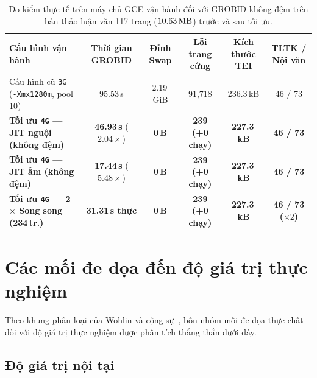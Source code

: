 {\setlength{\tabcolsep}{3.5pt}
\begin{table}[!htbp]
\centering
\caption{Đo kiểm thực tế trên máy chủ GCE vận hành đối với GROBID không đệm trên bản thảo luận văn 117 trang ($10.63\text{\,MB}$) trước và sau tối ưu.}\label{tab:nfr-grobid-prod}
\begin{tabular}{|L{0.28}|C{0.15}|C{0.13}|C{0.16}|C{0.13}|C{0.15}|}
\hline
\textbf{Cấu hình vận hành} & \textbf{Thời gian GROBID} & \textbf{Đỉnh Swap} & \textbf{Lỗi trang cứng} & \textbf{Kích thước TEI} & \textbf{TLTK / Nội văn} \\
\hline
Cấu hình cũ \texttt{3G} (\texttt{-Xmx1280m}, pool 10) & 95.53\,s & 2.19\,GiB & 91,718 & 236.3\,kB & 46 / 73 \\
\hline
\textbf{Tối ưu \texttt{4G} --- JIT nguội (không đệm)} & \textbf{46.93\,s} ($2.04\times$) & \textbf{0\,B} & \textbf{239 (+0 chạy)} & \textbf{227.3\,kB} & \textbf{46 / 73} \\
\hline
\textbf{Tối ưu \texttt{4G} --- JIT ấm (không đệm)} & \textbf{17.44\,s} ($5.48\times$) & \textbf{0\,B} & \textbf{239 (+0 chạy)} & \textbf{227.3\,kB} & \textbf{46 / 73} \\
\hline
\textbf{Tối ưu \texttt{4G} --- 2$\times$ Song song (234\,tr.)} & \textbf{31.31\,s thực} & \textbf{0\,B} & \textbf{239 (+0 chạy)} & \textbf{227.3\,kB} & \textbf{46 / 73 ($\times 2$)} \\
\hline
\end{tabular}
\end{table}
}


\section{Các mối đe dọa đến độ giá trị thực nghiệm}
\label{sec:difficulties}

Theo khung phân loại của Wohlin và cộng sự~\cite{wohlin2012experimentation}, bốn nhóm mối đe dọa thực chất đối với độ giá trị thực nghiệm được phân tích thẳng thắn dưới đây.

\subsection{Độ giá trị nội tại}

